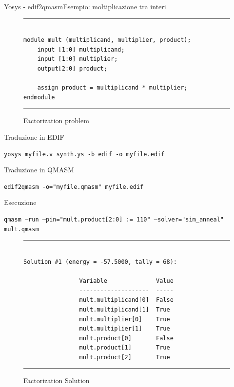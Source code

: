 \begin{frame}[fragile]{Yosys - edif2qmasm}{Esempio: moltiplicazione tra interi}
	\begin{minipage}{.48\linewidth}
		\begin{figure}[h]
			\begin{minipage}{\linewidth}
				\hrule
				\begin{verbatim}
					
module mult (multiplicand, multiplier, product);
	input [1:0] multiplicand;
	input [1:0] multiplier;
	output[2:0] product;
	
	assign product = multiplicand * multiplier;
endmodule
				\end{verbatim}
				\hrule
			\end{minipage}
			\caption{Factorization problem}
		\end{figure}
		\vspace{-.7cm}
		\begin{block}{Traduzione in EDIF}
			\begin{center}
				\scriptsize \texttt{yosys myfile.v synth.ys -b edif -o myfile.edif}
			\end{center}
		\end{block}
		\begin{block}{Traduzione in QMASM}
			\begin{center}
				\scriptsize \texttt{edif2qmasm -o="myfile.qmasm" myfile.edif}
			\end{center}
		\end{block}
	\end{minipage}
	\hfill
	\begin{minipage}{.48\linewidth}
		\begin{block}{Esecuzione}
			\begin{center}
				\scriptsize \texttt{qmasm --run --pin="mult.product[2:0] := 110" --solver="sim\_anneal" mult.qmasm}
			\end{center}
		\end{block}
		\vspace{-.1cm}
		\begin{figure}[h]
			\begin{minipage}{.9\linewidth}
				\hrule
				\begin{verbatim}
					
Solution #1 (energy = -57.5000, tally = 68):

				Variable              Value
				--------------------  -----
				mult.multiplicand[0]  False
				mult.multiplicand[1]  True
				mult.multiplier[0]    True
				mult.multiplier[1]    True
				mult.product[0]       False
				mult.product[1]       True
				mult.product[2]       True
				\end{verbatim}
				\hrule
			\end{minipage}
			\caption{Factorization Solution}
		\end{figure}
	\end{minipage}
\end{frame}

